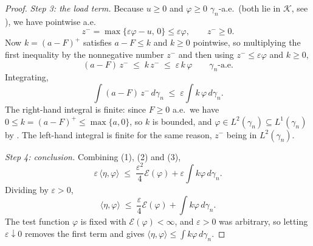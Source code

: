 \begin{proof}
\emph{Step 3: the load term.}
Because $u \geq 0$ and $\varphi \geq 0$ $\gamma_n$-a.e.\ (both lie in
$\mathcal{K}$, see ), we have pointwise a.e.
\[
  z^- = \max\{\varepsilon\varphi - u,\, 0\} \leq \varepsilon\varphi,
  \qquad z^- \geq 0 .
\]
Now $k = (a-F)^+$ satisfies $a - F \leq k$ and $k \geq 0$ pointwise, so
multiplying the first inequality by the nonnegative number $z^-$ and then using
$z^- \leq \varepsilon\varphi$ and $k \geq 0$,
\[
  (a-F)\,z^- \;\leq\; k\,z^- \;\leq\; \varepsilon\, k\,\varphi
  \qquad\gamma_n\text{-a.e.}
\]
Integrating,
\begin{equation*}
  \int (a-F)\,z^-\, d\gamma_n \;\leq\; \varepsilon \int k\,\varphi\, d\gamma_n .
  \tag{3}
\end{equation*}
The right-hand integral is finite: since $F \geq 0$ a.e.\ we have
$0 \leq k = (a-F)^+ \leq \max\{a,0\}$, so $k$ is bounded, and
$\varphi \in L^2(\gamma_n) \subseteq L^1(\gamma_n)$ by .  The
left-hand integral is finite for the same reason, $z^-$ being in
$L^2(\gamma_n)$.

\emph{Step 4: conclusion.}
Combining (1), (2) and (3),
\[
  \varepsilon\,\langle\eta,\varphi\rangle
    \;\leq\; \frac{\varepsilon^2}{4}\mathcal{E}(\varphi)
             + \varepsilon\int k\varphi\, d\gamma_n .
\]
Dividing by $\varepsilon > 0$,
\[
  \langle\eta,\varphi\rangle
    \;\leq\; \frac{\varepsilon}{4}\mathcal{E}(\varphi) + \int k\varphi\, d\gamma_n .
\]
The test function $\varphi$ is fixed with $\mathcal{E}(\varphi) < \infty$, and
$\varepsilon > 0$ was arbitrary, so letting $\varepsilon \downarrow 0$ removes the
first term and gives
$\langle\eta,\varphi\rangle \leq \int k\varphi\, d\gamma_n$.
\end{proof}
